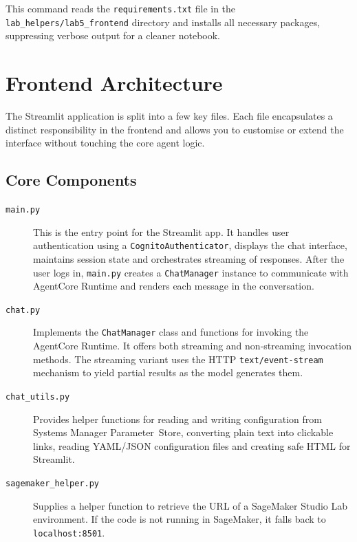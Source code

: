 This command reads the \texttt{requirements.txt} file in the
\texttt{lab\_helpers/lab5\_frontend} directory and installs all necessary
packages, suppressing verbose output for a cleaner notebook.

\section{Frontend Architecture}

The Streamlit application is split into a few key files.  Each file
encapsulates a distinct responsibility in the frontend and allows
you to customise or extend the interface without touching the core
agent logic.

\subsection{Core Components}

\begin{description}
  \item[\texttt{main.py}] This is the entry point for the Streamlit app.  It
    handles user authentication using a \texttt{CognitoAuthenticator},
    displays the chat interface, maintains session state and
    orchestrates streaming of responses.  After the user logs in,
    \texttt{main.py} creates a \texttt{ChatManager} instance to
    communicate with AgentCore Runtime and renders each message in the
    conversation.

  \item[\texttt{chat.py}] Implements the \texttt{ChatManager} class and
    functions for invoking the AgentCore Runtime.  It offers both
    streaming and non‑streaming invocation methods.  The streaming
    variant uses the HTTP \texttt{text/event-stream} mechanism to
    yield partial results as the model generates them.

  \item[\texttt{chat\_utils.py}] Provides helper functions for reading and
    writing configuration from Systems Manager Parameter Store,
    converting plain text into clickable links, reading YAML/JSON
    configuration files and creating safe HTML for Streamlit.

  \item[\texttt{sagemaker\_helper.py}] Supplies a helper function to retrieve
    the URL of a SageMaker Studio Lab environment.  If the code is not
    running in SageMaker, it falls back to \texttt{localhost:8501}.
\end{description}

